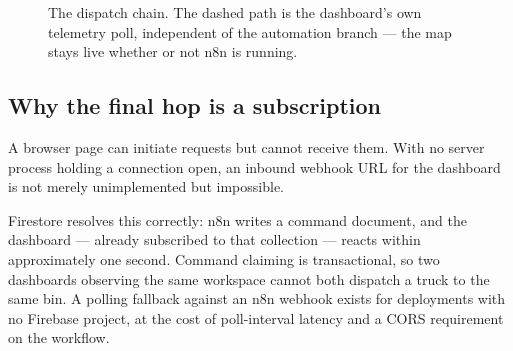 \documentclass[11pt,a4paper]{article}
\begin{document}
\begin{figure}[h]
\centering
{}
\caption{The dispatch chain. The dashed path is the dashboard's own
telemetry poll, independent of the automation branch --- the map stays
live whether or not n8n is running.}
\end{figure}

\subsection{Why the final hop is a subscription}

A browser page can initiate requests but cannot receive them. With no
server process holding a connection open, an inbound webhook URL for the
dashboard is not merely unimplemented but impossible.

Firestore resolves this correctly: n8n writes a command document, and the
dashboard --- already subscribed to that collection --- reacts within
approximately one second. Command claiming is transactional, so two
dashboards observing the same workspace cannot both dispatch a truck to
the same bin. A polling fallback against an n8n webhook exists for
deployments with no Firebase project, at the cost of poll-interval
latency and a CORS requirement on the workflow.
\end{document}
